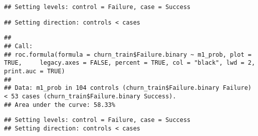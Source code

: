 \documentclass[
]{article}
\newenvironment{Shaded}{\begin{snugshade}}{\end{snugshade}}
\newcommand{\AttributeTok}[1]{\textcolor[rgb]{0.77,0.63,0.00}{#1}}
\newcommand{\ConstantTok}[1]{\textcolor[rgb]{0.00,0.00,0.00}{#1}}
\newcommand{\DecValTok}[1]{\textcolor[rgb]{0.00,0.00,0.81}{#1}}
\newcommand{\FunctionTok}[1]{\textcolor[rgb]{0.00,0.00,0.00}{#1}}
\newcommand{\NormalTok}[1]{#1}
\newcommand{\SpecialCharTok}[1]{\textcolor[rgb]{0.00,0.00,0.00}{#1}}
\newcommand{\StringTok}[1]{\textcolor[rgb]{0.31,0.60,0.02}{#1}}
\begin{document}
\begin{verbatim}
## Setting levels: control = Failure, case = Success
\end{verbatim}

\begin{verbatim}
## Setting direction: controls < cases
\end{verbatim}

\begin{verbatim}
## 
## Call:
## roc.formula(formula = churn_train$Failure.binary ~ m1_prob, plot = TRUE,     legacy.axes = FALSE, percent = TRUE, col = "black", lwd = 2,     print.auc = TRUE)
## 
## Data: m1_prob in 104 controls (churn_train$Failure.binary Failure) < 53 cases (churn_train$Failure.binary Success).
## Area under the curve: 58.33%
\end{verbatim}

\begin{Shaded}
\end{Shaded}

\begin{verbatim}
## Setting levels: control = Failure, case = Success
## Setting direction: controls < cases
\end{verbatim}

\begin{Shaded}
\end{Shaded}
\end{document}
